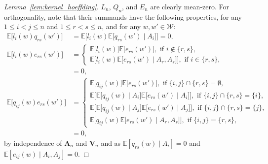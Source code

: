 \documentclass[11pt,lof]{puthesis}
\newcommand{\E}{\ensuremath{\mathbb{E}}}
\newcommand{\bA}{\ensuremath{\mathbf{A}}}
\newcommand{\bV}{\ensuremath{\mathbf{V}}}
\newcommand{\cW}{\ensuremath{\mathcal{W}}}
\theoremstyle{break}
\theoremstyle{proof}
\newtheorem{proof}{Proof}
\begin{document}
\begin{proof}[Lemma~\ref{lem:kernel_hoeffding}]
$L_n$, $Q_n$, and $E_n$
are clearly mean-zero.
For orthogonality,
note that their summands
have the following properties,
for any $1 \leq i < j \leq n$
and $1 \leq r < s \leq n$,
and for any $w, w' \in \cW$:
%
\begin{align*}
\E\big[
l_i(w)
q_{rs}(w')
\big]
&=
\E\big[
l_i(w)
\E\big[
q_{rs}(w') \mid A_i
\big]
\big]
= 0, \\
\E\big[
l_i(w)
e_{rs}(w')
\big]
&=
\begin{cases}
\E\big[
l_i(w)
\big]
\E\big[
e_{rs}(w')
\big],
\text{ if } i \notin \{r,s\}, \\
\E\big[
l_i(w)
\E\big[
e_{rs}(w') \mid A_r, A_s
\big]
\big],
\text{ if } i \in \{r,s\},
\end{cases} \\
&=
0, \\
\E\big[
q_{i j}(w)
e_{rs}(w')
\big]
&=
\begin{cases}
\E\big[
q_{i j}(w)
\big]
\E\big[
e_{rs}(w')
\big],
\text{ if } \{i,j\} \cap \{r,s\} = \emptyset, \\
\E\big[
\E\big[
q_{i j}(w) \mid A_i
\big]
\E\big[
e_{rs}(w') \mid A_i
\big]
\big],
\text{ if } \{i,j\} \cap \{r,s\} = \{i\}, \\
\E\big[
\E\big[
q_{i j}(w) \mid A_j
\big]
\E\big[
e_{rs}(w') \mid A_j
\big]
\big],
\text{ if } \{i,j\} \cap \{r,s\} = \{j\}, \\
\E\big[
q_{i j}(w)
\E\big[
e_{rs}(w') \mid A_r, A_s
\big]
\big],
\text{ if } \{i,j\} = \{r,s\},
\end{cases} \\
&=
0,
\end{align*}
%
by independence of $\bA_n$ and $\bV_n$
and as $\E[q_{rs}(w) \mid A_i] = 0$
and $\E[e_{i j}(w) \mid A_i, A_j] = 0$.
\end{proof}
\end{document}
